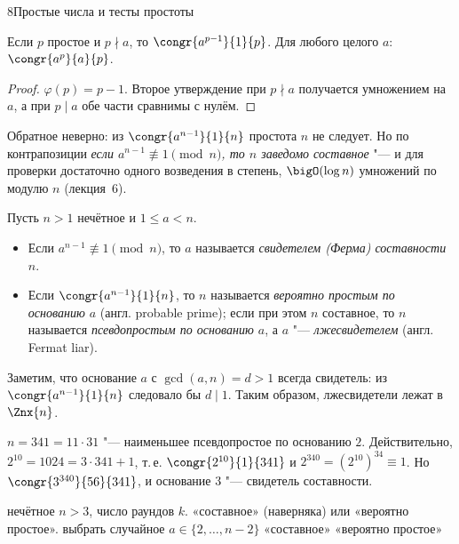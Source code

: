 \begin{lecture}{8}{Простые числа и тесты простоты}
\begin{corollary}\label{l8:fermat}
Если $p$ простое и $p \nmid a$, то $\congr{a^{p-1}}{1}{p}$. Для любого целого $a$:
$\congr{a^p}{a}{p}$.
\end{corollary}

\begin{proof}
$\varphi(p) = p - 1$. Второе утверждение при $p \nmid a$ получается умножением на $a$,
а при $p \mid a$ обе части сравнимы с нулём.
\end{proof}

Обратное неверно: из $\congr{a^{n-1}}{1}{n}$ простота $n$ не следует. Но по контрапозиции
\emph{если $a^{n-1} \not\equiv 1 \pmod n$, то $n$ заведомо составное} "--- и для проверки
достаточно одного возведения в степень, $\bigO(\log n)$ умножений по модулю $n$ (лекция~6).

\begin{definition}
Пусть $n > 1$ нечётное и $1 \le a < n$.
\begin{itemize}
  \item Если $a^{n-1} \not\equiv 1 \pmod n$, то $a$ называется \emph{свидетелем (Ферма)
    составности} $n$.
  \item Если $\congr{a^{n-1}}{1}{n}$, то $n$ называется \emph{вероятно простым по основанию $a$}
    (англ. probable prime); если при этом $n$ составное, то $n$ называется \emph{псевдопростым
    по основанию $a$}, а $a$ "--- \emph{лжесвидетелем} (англ. Fermat liar).
\end{itemize}
\end{definition}

Заметим, что основание $a$ с $\gcd(a, n) = d > 1$ всегда свидетель: из $\congr{a^{n-1}}{1}{n}$
следовало бы $d \mid 1$. Таким образом, лжесвидетели лежат в $\Znx{n}$.

\begin{example}\label{l8:ex341}
$n = 341 = 11 \cdot 31$ "--- наименьшее псевдопростое по основанию $2$. Действительно,
$2^{10} = 1024 = 3 \cdot 341 + 1$, т.\,е. $\congr{2^{10}}{1}{341}$ и
$2^{340} = (2^{10})^{34} \equiv 1$. Но $\congr{3^{340}}{56}{341}$, и основание $3$ "--- свидетель
составности.
\end{example}

\begin{algorithm}\label{l8:alg-fermat}
\begin{algorithmic}[1]
\Require нечётное $n > 3$, число раундов $k$.
\Ensure «составное» (наверняка) или «вероятно простое».
  \State выбрать случайное $a \in \{2, \ldots, n - 2\}$
   \Return «составное» \EndIf
\EndFor
\State \Return «вероятно простое»
\end{algorithmic}
\end{algorithm}


\end{lecture}
